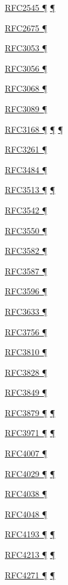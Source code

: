 \documentclass[
]{article}
\begin{document}
\hyperref[routing]{RFC2545 ¶} \hyperref[routing-operation]{¶}

\hyperref[packet-size-and-jumbo-frames]{RFC2675 ¶}

\hyperref[obsolete-techniques]{RFC3053 ¶}

\hyperref[obsolete-techniques]{RFC3056 ¶}

\hyperref[obsolete-techniques]{RFC3068 ¶}

\hyperref[obsolete-techniques]{RFC3089 ¶}

\hyperref[packet-format]{RFC3168 ¶}
\hyperref[traffic-class-and-flow-label]{¶}
\hyperref[transport-protocols]{¶}

\hyperref[transport-protocols]{RFC3261 ¶}

\hyperref[source-and-destination-address-selection]{RFC3484 ¶}

\hyperref[obsolete-features-in-ipv6]{RFC3513 ¶}
\hyperref[markdown-usage]{¶}

\hyperref[dual-stack-scenarios]{RFC3542 ¶}

\hyperref[transport-protocols]{RFC3550 ¶}

\hyperref[multihoming]{RFC3582 ¶}

\hyperref[addresses]{RFC3587 ¶}

\hyperref[dns]{RFC3596 ¶}

\hyperref[managed-configuration]{RFC3633 ¶}

\hyperref[layer-2-considerations]{RFC3756 ¶}

\hyperref[address-resolution]{RFC3810 ¶}

\hyperref[transport-protocols]{RFC3828 ¶}

\hyperref[addresses]{RFC3849 ¶}

\hyperref[addresses]{RFC3879 ¶} \hyperref[obsolete-features-in-ipv6]{¶}

\hyperref[security]{RFC3971 ¶} \hyperref[layer-2-considerations]{¶}

\hyperref[addresses]{RFC4007 ¶}

\hyperref[layer-2-functions]{RFC4029 ¶} \hyperref[tunnels]{¶}

\hyperref[addresses]{RFC4038 ¶}

\hyperref[addresses]{RFC4048 ¶}

\hyperref[filtering]{RFC4193 ¶} \hyperref[multihoming]{¶}

\hyperref[dual-stack-scenarios]{RFC4213 ¶} \hyperref[tunnels]{¶}

\hyperref[routing]{RFC4271 ¶} \hyperref[routing-operation]{¶}
\end{document}
